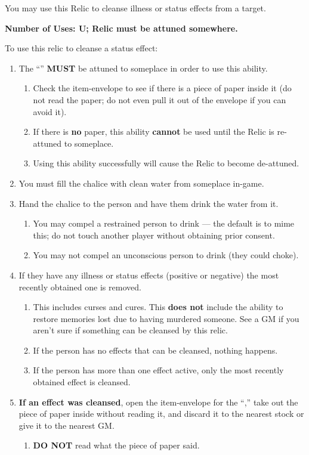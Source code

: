 \documentclass[green]{GL2020}
\begin{document}
\name{\gStatusCleanse{}}

You may use this Relic to cleanse illness or status effects from a target. 

\textbf{Number of Uses: U; Relic must be attuned somewhere.}

To use this relic to cleanse a status effect:
\begin{enumerate}
  \item The ``\iChalice{}'' \textbf{MUST} be attuned to someplace in order to use this ability.
  \begin{enumerate}
    \item Check the item-envelope to see if there is a piece of paper inside it (do not read the paper; do not even pull it out of the envelope if you can avoid it).
    \item If there is \textbf{no} paper, this ability \textbf{cannot} be used until the Relic is re-attuned to someplace.
    \item Using this ability successfully will cause the Relic to become de-attuned.
  \end{enumerate}
  \item You must fill the chalice with clean water from someplace in-game.
  \item Hand the chalice to the person and have them drink the water from it.
  \begin{enumerate}
    \item You may compel a restrained person to drink — the default is to mime this; do not touch another player without obtaining prior consent.
    \item You may not compel an unconscious person to drink (they could choke).
  \end{enumerate}
  \item If they have any illness or status effects (positive or negative) the most recently obtained one is removed.
  \begin{enumerate}
    \item This includes curses and cures. This \textbf{does not} include the ability to restore memories lost due to having murdered someone. See a GM if you aren’t sure if something can be cleansed by this relic.
    \item If the person has no effects that can be cleansed, nothing happens.
    \item If the person has more than one effect active, only the most recently obtained effect is cleansed.
  \end{enumerate}
  \item \textbf{If an effect was cleansed}, open the item-envelope for the ``\iChalice{},'' take out the piece of paper inside without reading it, and discard it to the nearest stock or give it to the nearest GM.
  \begin{enumerate}
    \item \textbf{DO NOT} read what the piece of paper said.
  \end{enumerate}
\end{enumerate}
\end{document}

